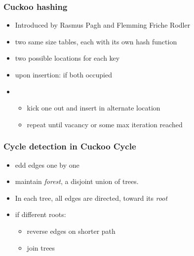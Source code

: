 \documentclass{beamer}
\begin{document}
\begin{frame}
\frametitle{Cuckoo hashing}
\begin{itemize}
\item Introduced by Rasmus Pagh and Flemming Friche Rodler
\pause
\item two same size tables, each with its own hash function
\pause
\item two possible locations for each key
\pause
\item upon insertion: if both occupied
\pause
\item
\begin{itemize}
\item kick one out and insert in alternate location
\pause
\item repeat until vacancy or some max iteration reached
\end{itemize}
\end{itemize}
\end{frame}

\begin{frame}
\frametitle{Cycle detection in Cuckoo Cycle}
\begin{itemize}
\item edd edges one by one
\pause
\item maintain {\em forest}, a disjoint union of trees.
\item In each tree, all edges are directed, toward its {\em root}
\pause
\item if different roots:
\begin{itemize}
\item reverse edges on shorter path
\item join trees
\end{itemize}
\end{itemize}
\end{frame}
\end{document}
